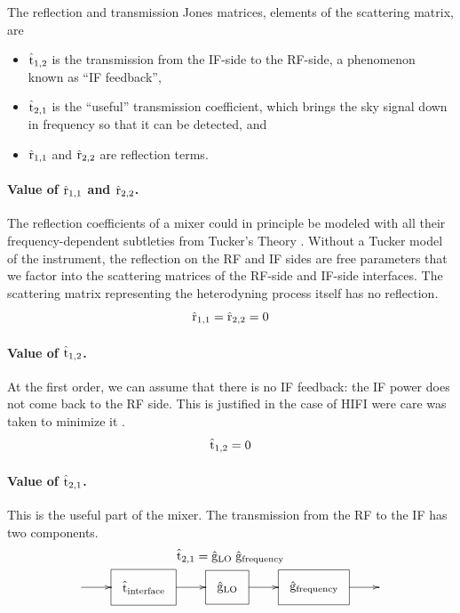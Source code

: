 \begin{samepage}
The reflection and transmission Jones matrices, elements of the scattering matrix, are
\begin{itemize}%
    \item $\hat{\mathrm{t}}_{1,2}$ is the transmission from the IF-side to the RF-side, a phenomenon known as ``IF feedback'',
    \item $\hat{\mathrm{t}}_{2,1}$ is the ``useful'' transmission coefficient, which brings the sky signal down in frequency so that it can be detected, and
    \item $\hat{\mathrm{r}}_{1,1}$ and $\hat{\mathrm{r}}_{2,2}$ are reflection terms.
\end{itemize}
\end{samepage}

\paragraph{Value of $\hat{\mathrm{r}}_{1,1}$ and $\hat{\mathrm{r}}_{2,2}$.}
The reflection coefficients of a mixer could in principle be modeled with all their frequency-dependent subtleties from Tucker's Theory \parencite{tucker1985quantum}.
Without a Tucker model of the instrument, the reflection on the RF and IF sides are free parameters that we factor into the scattering matrices of the RF-side and IF-side interfaces.
The scattering matrix representing the heterodyning process itself has no reflection.
\begin{equation}
    \hat{\mathrm{r}}_{1,1} = \hat{\mathrm{r}}_{2,2} = 0
\end{equation}

\paragraph{Value of $\hat{\mathrm{t}}_{1,2}$.}
At the first order, we can assume that there is no IF feedback: the IF power does not come back to the RF side.
This is justified in the case of HIFI were care was taken to minimize it \parencite{dieleman2008hifi}.
\begin{equation}
    \hat{\mathrm{t}}_{1,2}=0
\end{equation}

\paragraph{Value of $\hat{\mathrm{t}}_{2,1}$.}
This is the useful part of the mixer.
The transmission from the RF to the IF has two components.
\begin{gather}
    \matrcp{t}_{2,1} =
    \matrcp{g}_\text{LO} \;
    \matrcp{g}_\text{frequency}
    \\
    \xymatrix{
        \ar[r]
        &
        *+++[F]{\matrcp{t}_\text{interface}}
        \ar[r]
        &
        *+++[F]{\matrcp{g}_\text{LO}}
        \ar[r]
        &
        *+++[F]{\matrcp{g}_\text{frequency}}
        \ar[r]
        &
    }\notag
\end{gather}


